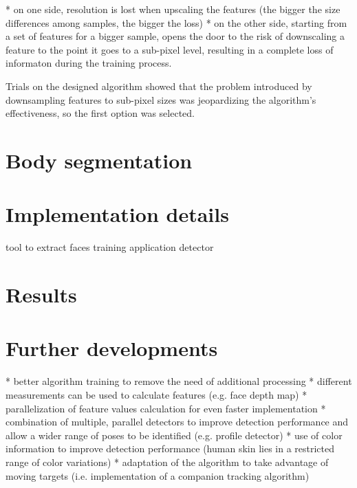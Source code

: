 \documentclass[a4paper,12pt,titlepage]{article}
\begin{document}
* on one side, resolution is lost when upscaling the features (the bigger the
  size differences among samples, the bigger the loss)
* on the other side, starting from a set of features for a bigger sample, opens
  the door to the risk of downscaling a feature to the point it goes to a
  sub-pixel level, resulting in a complete loss of informaton during the training
  process.

Trials on the designed algorithm showed that the problem introduced by
downsampling features to sub-pixel sizes was jeopardizing the algorithm's
effectiveness, so the first option was selected.

\section{Body segmentation}

\section{Implementation details}
tool to extract faces
training application
detector


\section{Results}

\section{Further developments}
* better algorithm training to remove the need of additional processing
* different measurements can be used to calculate features (e.g. face depth map)
* parallelization of feature values calculation for even faster implementation
* combination of multiple, parallel detectors to improve detection performance
  and allow a wider range of poses to be identified (e.g. profile detector)
* use of color information to improve detection performance (human skin lies in
  a restricted range of color variations)
* adaptation of the algorithm to take advantage of moving targets (i.e.
  implementation of a companion tracking algorithm)
\end{document}
